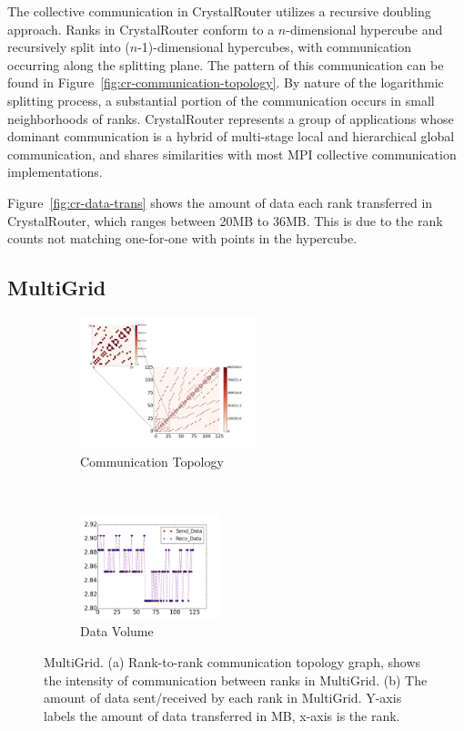 \documentclass[conference]{IEEEtran}
\begin{document}
The collective communication in CrystalRouter utilizes a recursive doubling approach. Ranks in CrystalRouter conform to a $n$-dimensional hypercube and recursively split into ($n$-1)-dimensional hypercubes, with communication occurring along the splitting plane. The pattern of this communication can be found in Figure~\ref{fig:cr-communication-topology}. By nature of the logarithmic splitting process, a substantial portion of the communication occurs in small neighborhoods of ranks. CrystalRouter represents a group of applications whose dominant communication is a hybrid of multi-stage local and hierarchical global communication, and shares similarities with most MPI collective communication implementations.

Figure~\ref{fig:cr-data-trans} shows the amount of data each rank transferred in CrystalRouter, which ranges between 20MB to 36MB. This is due to the rank counts not matching one-for-one with points in the hypercube.

\subsection{MultiGrid}
\label{sec:multigrid}

\begin{figure}[t!]
    \centering
    \begin{subfigure}[t]{0.25\textwidth}
        \centering
        \includegraphics[height=1.5in]{figs/appstudy/mg/mg_pip}
        \caption{Communication Topology}
        \label{fig:mg-communication-topology}
    \end{subfigure}
    ~
    \begin{subfigure}[t]{0.22\textwidth}
        \centering
        \includegraphics[height=1.2in]{figs/appstudy/mg/mg_data_transfer}
        \caption{Data Volume}
        \label{fig:mg-data-trans}
    \end{subfigure}
    \caption{MultiGrid. (a) Rank-to-rank communication topology graph, shows the intensity of communication between ranks in MultiGrid. (b) The amount of data sent/received by each rank in MultiGrid. Y-axis labels the amount of data transferred in MB, x-axis is the rank. }
\end{figure}
\end{document}
